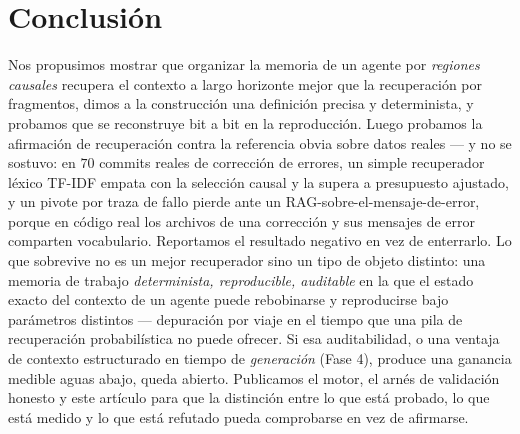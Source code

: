 \documentclass[11pt]{article}
\begin{document}
\section{Conclusión}

Nos propusimos mostrar que organizar la memoria de un agente por \emph{regiones
causales} recupera el contexto a largo horizonte mejor que la recuperación por
fragmentos, dimos a la construcción una definición precisa y determinista, y probamos
que se reconstruye bit a bit en la reproducción. Luego probamos la afirmación de
recuperación contra la referencia obvia sobre datos reales --- y no se sostuvo: en $70$
commits reales de corrección de errores, un simple recuperador léxico TF-IDF empata con
la selección causal y la supera a presupuesto ajustado, y un pivote por traza de fallo
pierde ante un RAG-sobre-el-mensaje-de-error, porque en código real los archivos de una
corrección y sus mensajes de error comparten vocabulario. Reportamos el resultado
negativo en vez de enterrarlo. Lo que sobrevive no es un mejor recuperador sino un tipo
de objeto distinto: una memoria de trabajo \emph{determinista, reproducible, auditable}
en la que el estado exacto del contexto de un agente puede rebobinarse y reproducirse
bajo parámetros distintos --- depuración por viaje en el tiempo que una pila de
recuperación probabilística no puede ofrecer. Si esa auditabilidad, o una ventaja de
contexto estructurado en tiempo de \emph{generación} (Fase 4), produce una ganancia
medible aguas abajo, queda abierto. Publicamos el motor, el arnés de validación honesto
y este artículo para que la distinción entre lo que está probado, lo que está medido y
lo que está refutado pueda comprobarse en vez de afirmarse.
\end{document}
